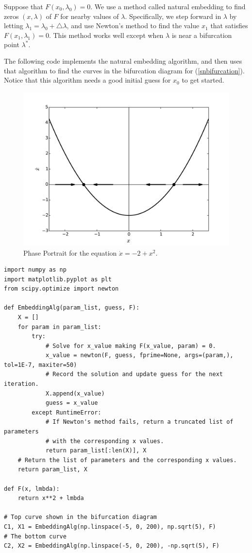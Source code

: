 Suppose that $F(x_0,\lambda_0) = 0.$
We use a method called natural embedding to find zeros $(x,\lambda)$ of $F$ for nearby values of $\lambda$.
Specifically, we step forward in $\lambda$ by letting $\lambda_1 = \lambda_0 + \triangle \lambda$, and use Newton's method to find the value $x_1$ that satisfies $F(x_1,\lambda_1) = 0.$
This method works well except when $\lambda$ is near a bifurcation point $\lambda^*$.

The following code implements the natural embedding algorithm, and then uses that algorithm to find the curves in the bifurcation diagram for (\ref{snbifurcation}).
Notice that this algorithm needs a good initial guess for $x_0$ to get started.

\begin{figure}
\centering
\includegraphics[width=\textwidth]{SaddleNPhasePortrait.pdf}
\caption{Phase Portrait for the equation $\dot{x} = -2 + x^2$.}
\label{phaseportrait:sn}
\end{figure}

\begin{lstlisting}
import numpy as np
import matplotlib.pyplot as plt
from scipy.optimize import newton

def EmbeddingAlg(param_list, guess, F):
    X = []
    for param in param_list:
        try:
            # Solve for x_value making F(x_value, param) = 0.
            x_value = newton(F, guess, fprime=None, args=(param,), tol=1E-7, maxiter=50)
            # Record the solution and update guess for the next iteration.
            X.append(x_value)
            guess = x_value
        except RuntimeError:
            # If Newton's method fails, return a truncated list of parameters
            # with the corresponding x values.
            return param_list[:len(X)], X
    # Return the list of parameters and the corresponding x values.
    return param_list, X

def F(x, lmbda):
    return x**2 + lmbda

# Top curve shown in the bifurcation diagram
C1, X1 = EmbeddingAlg(np.linspace(-5, 0, 200), np.sqrt(5), F)
# The bottom curve
C2, X2 = EmbeddingAlg(np.linspace(-5, 0, 200), -np.sqrt(5), F)
\end{lstlisting}

